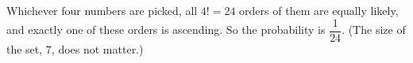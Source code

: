 Whichever four numbers are picked, all $4!=24$ orders of them are equally likely, and exactly one of these orders is ascending. So the probability is $\boxed{\dfrac{1}{24}}$. (The size of the set, $7$, does not matter.)
